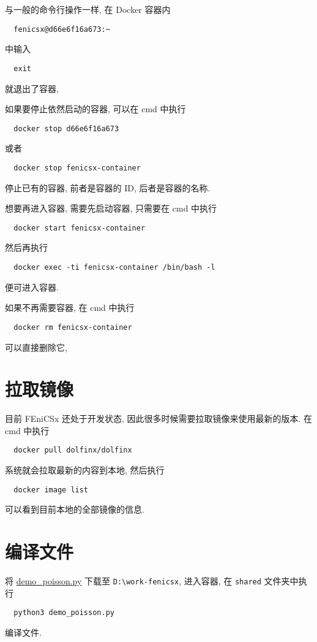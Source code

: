 \documentclass[fontset=founder]{ctexrep}
\begin{document}
与一般的命令行操作一样,
在 Docker 容器内
\begin{lstlisting}
  fenicsx@d66e6f16a673:~
\end{lstlisting}
中输入
\begin{lstlisting}
  exit
\end{lstlisting}
就退出了容器,

如果要停止依然启动的容器,
可以在 \textsf{cmd} 中执行
\begin{lstlisting}
  docker stop d66e6f16a673
\end{lstlisting}
或者
\begin{lstlisting}
  docker stop fenicsx-container
\end{lstlisting}
停止已有的容器,
前者是容器的 ID,
后者是容器的名称.

想要再进入容器,
需要先启动容器,
只需要在 \textsf{cmd} 中执行
\begin{lstlisting}
  docker start fenicsx-container
\end{lstlisting}
然后再执行
\begin{lstlisting}
  docker exec -ti fenicsx-container /bin/bash -l
\end{lstlisting}
便可进入容器.

如果不再需要容器,
在 \textsf{cmd} 中执行
\begin{lstlisting}
  docker rm fenicsx-container
\end{lstlisting}
可以直接删除它,

\section{拉取镜像}

目前 FEniCSx 还处于开发状态,
因此很多时候需要拉取镜像来使用最新的版本.
在 \textsf{cmd} 中执行
\begin{lstlisting}
  docker pull dolfinx/dolfinx
\end{lstlisting}
系统就会拉取最新的内容到本地,
然后执行
\begin{lstlisting}
  docker image list
\end{lstlisting}
可以看到目前本地的全部镜像的信息.

\section{编译文件}

将 \href{https://docs.fenicsproject.org/dolfinx/main/python/_downloads/b94ac7be61dc3726ca331afd20f195d2/demo_poisson.py}{demo\_poisson.py} 下载至 \texttt{D:\textbackslash work-fenicsx},
进入容器,
在 \texttt{shared} 文件夹中执行
\begin{lstlisting}
  python3 demo_poisson.py
\end{lstlisting}
编译文件.
\end{document}
